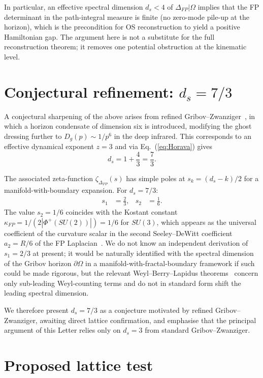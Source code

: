 \documentclass[aps,prl,reprint,nofootinbib,superscriptaddress,floatfix]{revtex4-2}
\begin{document}
In particular, an effective spectral dimension $d_s < 4$ of $\Delta_{FP}|\Omega$ implies that the FP determinant in the path-integral measure is finite (no zero-mode pile-up at the horizon), which is the precondition for OS reconstruction to yield a positive Hamiltonian gap. The argument here is not a substitute for the full reconstruction theorem; it removes one potential obstruction at the kinematic level.

\section{Conjectural refinement: $d_s = 7/3$}

A conjectural sharpening of the above arises from refined Gribov--Zwanziger~\cite{Dudal2008}, in which a horizon condensate of dimension six is introduced, modifying the ghost dressing further to $D_g(p) \sim 1/p^6$ in the deep infrared. This corresponds to an effective dynamical exponent $z = 3$ and via Eq.~(\ref{eq:Horava}) gives
\begin{equation}
d_s = 1 + \frac{4}{3} = \frac{7}{3}.
\end{equation}

The associated zeta-function $\zeta_{\Delta_{FP}}(s)$ has simple poles at $s_k = (d_s - k)/2$ for a manifold-with-boundary expansion. For $d_s = 7/3$:
\begin{align}
s_1 &= \frac{2}{3}, & s_2 &= \frac{1}{6}.
\end{align}
The value $s_2 = 1/6$ coincides with the Kostant constant $\kappa_{FP} = 1/(2|\Phi^+(SU(2))|) = 1/6$ for $SU(3)$, which appears as the universal coefficient of the curvature scalar in the second Seeley--DeWitt coefficient $a_2 = R/6$ of the FP Laplacian~\cite{Vassilevich}. We do not know an independent derivation of $s_1 = 2/3$ at present; it would be naturally identified with the spectral dimension of the Gribov horizon $\partial\Omega$ in a manifold-with-fractal-boundary framework if such could be made rigorous, but the relevant Weyl--Berry--Lapidus theorems~\cite{LapidusPang1997} concern only sub-leading Weyl-counting terms and do not in standard form shift the leading spectral dimension.

We therefore present $d_s = 7/3$ as a conjecture motivated by refined Gribov--Zwanziger, awaiting direct lattice confirmation, and emphasise that the principal argument of this Letter relies only on $d_s = 3$ from standard Gribov--Zwanziger.

\section{Proposed lattice test}
\end{document}
